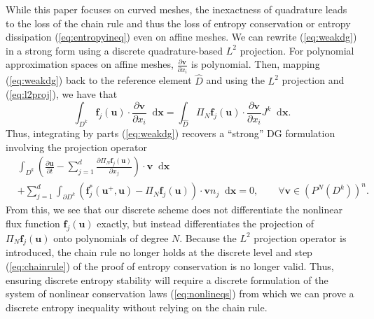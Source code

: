 \documentclass[preprint,10pt]{article}
\theoremstyle{definition}
\theoremstyle{lemma}
\theoremstyle{theorem}
\theoremstyle{assumption}
\renewcommand{\hat}{\widehat}
\newcommand{\pd}[2]{\frac{\partial#1}{\partial#2}}
\newcommand{\LRp}[1]{\left( #1 \right)}
\newcommand{\note}[1]{{\color{blue}{#1}}}
\newcommand{\lcwnote}[1]{{\color{magenta}{#1}}}
\newcommand*\diff[1]{\mathop{}\!{\mathrm{d}#1}} %
\begin{document}
While this paper focuses on curved meshes, the inexactness of quadrature leads to the loss of the chain rule and thus the loss of entropy conservation or entropy dissipation (\ref{eq:entropyineq}) even on affine meshes.  We can rewrite (\ref{eq:weakdg}) in a strong form using a discrete quadrature-based $L^2$ projection.  For polynomial approximation spaces on affine meshes, $\pd{\bm{v}}{x_i}$ is polynomial.  
Then, mapping (\ref{eq:weakdg}) back to the reference element $\hat{D}$ and using the $L^2$ projection and (\ref{eq:l2proj}), we have that
\[
\int_{D^k} \bm{f}_j(\bm{u}) \cdot \pd{\bm{v}}{x_i} \diff{\bm{x}} = \int_{\hat{D}} \Pi_N \bm{f}_j(\bm{u}) \cdot \pd{\bm{v}}{x_i} J^k\diff{\bm{x}}.
\]
Thus, integrating by parts (\ref{eq:weakdg}) recovers a ``strong'' DG formulation involving the projection operator
\begin{align}
&\int_{D^k} \LRp{\pd{\bm{u}}{t} - \sum_{j=1}^d \pd{\Pi_N \bm{f}_j(\bm{u})}{x_j}} \cdot \bm{v} \diff{\bm{x}} \nonumber\\
&+ \sum_{j=1}^d \int_{\partial D^k} \LRp{\bm{f}^*_j\LRp{\bm{u}^+,\bm{u}} - \Pi_N\bm{f}_j(\bm{u})}\cdot \bm{v} n_j  \diff{\bm{x}} = 0, \qquad \forall \bm{v}\in \LRp{P^N\LRp{D^k}}^n.  
\label{eq:strongdg}
\end{align}
From this, we see that our discrete scheme does not differentiate the nonlinear flux function $\bm{f}_j\LRp{\bm{u}}$ exactly, but instead differentiates the projection of $\Pi_N \bm{f}_j\LRp{\bm{u}}$ onto polynomials of degree $N$.  Because the $L^2$ projection operator is introduced, the chain rule no longer holds at the discrete level and step (\ref{eq:chainrule}) of the proof of entropy conservation is no longer valid.  Thus, ensuring discrete entropy stability will require a discrete formulation of the system of nonlinear conservation laws (\ref{eq:nonlineqs}) from which we can prove a discrete entropy inequality without relying on the chain rule.  

\end{document}
